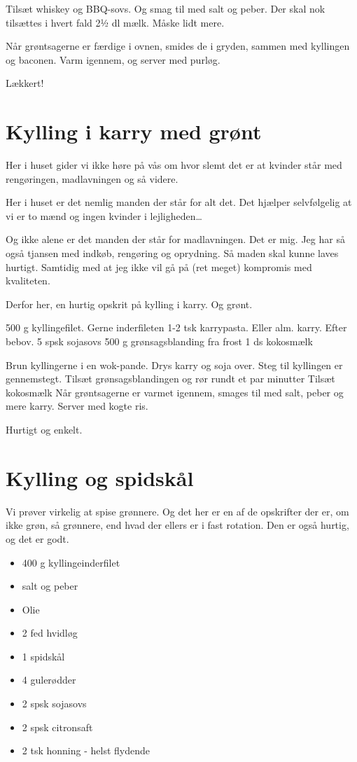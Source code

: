 \documentclass[
  letterpaper,
  DIV=11,
  numbers=noendperiod]{scrreprt}
\providecommand{\tightlist}{%
  \setlength{\itemsep}{0pt}\setlength{\parskip}{0pt}}\usepackage{longtable,booktabs,array}
\begin{document}
Tilsæt whiskey og BBQ-sovs. Og smag til med salt og peber. Der skal nok
tilsættes i hvert fald 2½ dl mælk. Måske lidt mere.

Når grøntsagerne er færdige i ovnen, smides de i gryden, sammen med
kyllingen og baconen. Varm igennem, og server med purløg.

Lækkert!

\hypertarget{kylling-i-karry-med-gruxf8nt}{%
\section{Kylling i karry med grønt}\label{kylling-i-karry-med-gruxf8nt}}

Her i huset gider vi ikke høre på vås om hvor slemt det er at kvinder
står med rengøringen, madlavningen og så videre.

Her i huset er det nemlig manden der står for alt det. Det hjælper
selvfølgelig at vi er to mænd og ingen kvinder i lejligheden\ldots{}

Og ikke alene er det manden der står for madlavningen. Det er mig. Jeg
har så også tjansen med indkøb, rengøring og oprydning. Så maden skal
kunne laves hurtigt. Samtidig med at jeg ikke vil gå på (ret meget)
kompromis med kvaliteten.

Derfor her, en hurtig opskrit på kylling i karry. Og grønt.

500 g kyllingefilet. Gerne inderfileten 1-2 tsk karrypasta. Eller alm.
karry. Efter bebov. 5 spsk sojasovs 500 g grønsagsblanding fra frost 1
ds kokosmælk

Brun kyllingerne i en wok-pande. Drys karry og soja over. Steg til
kyllingen er gennemstegt. Tilsæt grønsagsblandingen og rør rundt et par
minutter Tilsæt kokosmælk Når grøntsagerne er varmet igennem, smages til
med salt, peber og mere karry. Server med kogte ris.

Hurtigt og enkelt.

\hypertarget{kylling-og-spidskuxe5l}{%
\section{Kylling og spidskål}\label{kylling-og-spidskuxe5l}}

Vi prøver virkelig at spise grønnere. Og det her er en af de opskrifter
der er, om ikke grøn, så grønnere, end hvad der ellers er i fast
rotation. Den er også hurtig, og det er godt.

\begin{itemize}
\tightlist
\item
  400 g kyllingeinderfilet
\item
  salt og peber
\item
  Olie
\item
  2 fed hvidløg
\item
  1 spidskål
\item
  4 gulerødder
\item
  2 spsk sojasovs
\item
  2 spsk citronsaft
\item
  2 tsk honning - helst flydende
\end{itemize}
\end{document}
